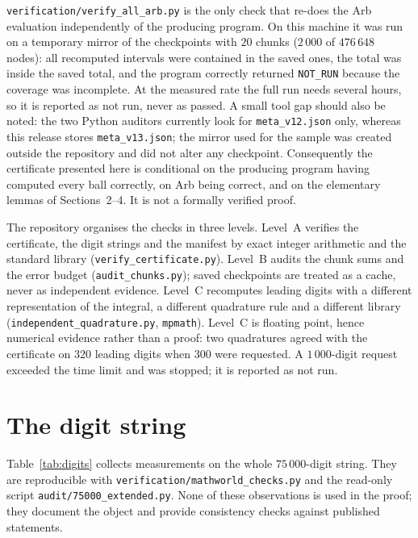 \documentclass[11pt,a4paper]{article}
\theoremstyle{remark}
\begin{document}
\texttt{verification/verify\_all\_arb.py} is the only check that re-does
the Arb evaluation independently of the producing program. On this
machine it was run on a temporary mirror of the checkpoints with
$20$ chunks ($2\,000$ of $476\,648$ nodes): all recomputed intervals were
contained in the saved ones, the total was inside the saved total, and
the program correctly returned \texttt{NOT\_RUN} because the coverage was
incomplete. At the measured rate the full run needs several hours, so it
is reported as not run, never as passed. A small tool gap should also be
noted: the two Python auditors currently look for \texttt{meta\_v12.json}
only, whereas this release stores \texttt{meta\_v13.json}; the mirror used
for the sample was created outside the repository and did not alter any
checkpoint. Consequently the certificate presented here is conditional on
the producing program having computed every ball correctly, on Arb being
correct, and on the elementary lemmas of Sections~2--4. It is not a
formally verified proof.

The repository organises the checks in three levels. Level~A verifies the
certificate, the digit strings and the manifest by exact integer
arithmetic and the standard library (\texttt{verify\_certificate.py}).
Level~B audits the chunk sums and the error budget
(\texttt{audit\_chunks.py}); saved checkpoints are treated as a cache,
never as independent evidence. Level~C recomputes leading digits with a
different representation of the integral, a different quadrature rule and
a different library (\texttt{independent\_quadrature.py}, \texttt{mpmath}).
Level~C is floating point, hence numerical evidence rather than a proof:
two quadratures agreed with the certificate on $320$ leading digits when
$300$ were requested. A $1\,000$-digit request exceeded the time limit and
was stopped; it is reported as not run.

\section{The digit string}

Table~\ref{tab:digits} collects measurements on the whole $75\,000$-digit
string. They are reproducible with \texttt{verification/mathworld\_checks.py}
and the read-only script \texttt{audit/75000\_extended.py}. None of these
observations is used in the proof; they document the object and provide
consistency checks against published statements.
\end{document}
